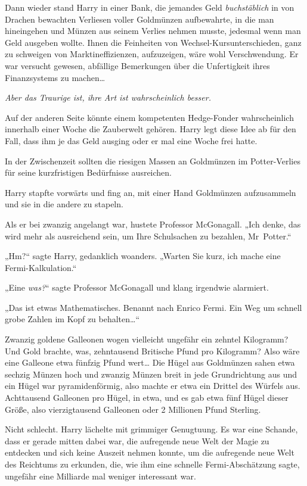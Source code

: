 {Dann wieder stand Harry in einer Bank, die jemandes Geld \emph{buchstäblich} in von Drachen bewachten Verliesen voller Goldmünzen aufbewahrte, in die man hineingehen und Münzen aus seinem Verlies nehmen musste, jedesmal wenn man Geld ausgeben wollte. Ihnen die Feinheiten von Wechsel-Kursunterschieden, ganz zu schweigen von Marktineffizienzen, aufzuzeigen, wäre wohl Verschwendung. Er war versucht gewesen, abfällige Bemerkungen über die Unfertigkeit ihres Finanzsystems zu machen…

\emph{Aber das Traurige ist, ihre Art ist wahrscheinlich besser.}

Auf der anderen Seite könnte einem kompetenten Hedge-Fonder wahrscheinlich innerhalb einer Woche die Zauberwelt gehören. Harry legt diese Idee ab für den Fall, dass ihm je das Geld ausging oder er mal eine Woche frei hatte.

In der Zwischenzeit sollten die riesigen Massen an Goldmünzen im Potter-Verlies für seine kurzfristigen Bedürfnisse ausreichen.

Harry stapfte vorwärts und fing an, mit einer Hand Goldmünzen aufzusammeln und sie in die andere zu stapeln.

Als er bei zwanzig angelangt war, hustete Professor McGonagall. „Ich denke, das wird mehr als ausreichend sein, um Ihre Schulsachen zu bezahlen, Mr~Potter.“

„Hm?“ sagte Harry, gedanklich woanders. „Warten Sie kurz, ich mache eine Fermi-Kalkulation.“

„Eine \emph{was?}“ sagte Professor McGonagall und klang irgendwie alarmiert.

„Das ist etwas Mathematisches. Benannt nach Enrico Fermi. Ein Weg um schnell grobe Zahlen im Kopf zu behalten…“

Zwanzig goldene Galleonen wogen vielleicht ungefähr ein zehntel Kilogramm? Und Gold brachte, was, zehntausend Britische Pfund pro Kilogramm? Also wäre eine Galleone etwa fünfzig Pfund wert… Die Hügel aus Goldmünzen sahen etwa sechzig Münzen hoch und zwanzig Münzen breit in jede Grundrichtung aus und ein Hügel war pyramidenförmig, also machte er etwa ein Drittel des Würfels aus. Achttausend Galleonen pro Hügel, in etwa, und es gab etwa fünf Hügel dieser Größe, also vierzigtausend Galleonen oder 2 Millionen Pfund Sterling.

Nicht schlecht. Harry lächelte mit grimmiger Genugtuung. Es war eine Schande, dass er gerade mitten dabei war, die aufregende neue Welt der Magie zu entdecken und sich keine Auszeit nehmen konnte, um die aufregende neue Welt des Reichtums zu erkunden, die, wie ihm eine schnelle Fermi-Abschätzung sagte, ungefähr eine Milliarde mal weniger interessant war.

}

